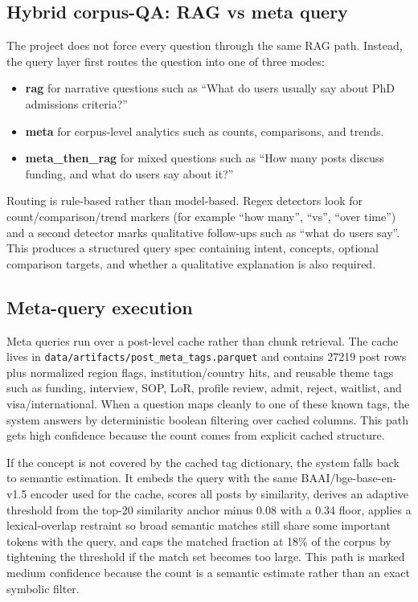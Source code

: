 \documentclass[11pt]{article}
\begin{document}
        \subsection*{Hybrid corpus-QA: RAG vs meta query}
        The project does not force every question through the same RAG path. Instead, the query layer first routes the question into one of three modes:
        \begin{itemize}
        \item \textbf{rag} for narrative questions such as ``What do users usually say about PhD admissions criteria?''
        \item \textbf{meta} for corpus-level analytics such as counts, comparisons, and trends.
        \item \textbf{meta\_then\_rag} for mixed questions such as ``How many posts discuss funding, and what do users say about it?''
        \end{itemize}

        Routing is rule-based rather than model-based. Regex detectors look for count/comparison/trend markers (for example ``how many'', ``vs'', ``over time'') and a second detector marks qualitative follow-ups such as ``what do users say''. This produces a structured query spec containing intent, concepts, optional comparison targets, and whether a qualitative explanation is also required.

        \subsection*{Meta-query execution}
        Meta queries run over a post-level cache rather than chunk retrieval. The cache lives in \texttt{data/artifacts/post\_meta\_tags.parquet} and contains 27219 post rows plus normalized region flags, institution/country hits, and reusable theme tags such as funding, interview, SOP, LoR, profile review, admit, reject, waitlist, and visa/international. When a question maps cleanly to one of these known tags, the system answers by deterministic boolean filtering over cached columns. This path gets high confidence because the count comes from explicit cached structure.

        If the concept is not covered by the cached tag dictionary, the system falls back to semantic estimation. It embeds the query with the same BAAI/bge-base-en-v1.5 encoder used for the cache, scores all posts by similarity, derives an adaptive threshold from the top-20 similarity anchor minus 0.08 with a 0.34 floor, applies a lexical-overlap restraint so broad semantic matches still share some important tokens with the query, and caps the matched fraction at 18\% of the corpus by tightening the threshold if the match set becomes too large. This path is marked medium confidence because the count is a semantic estimate rather than an exact symbolic filter.
\end{document}
